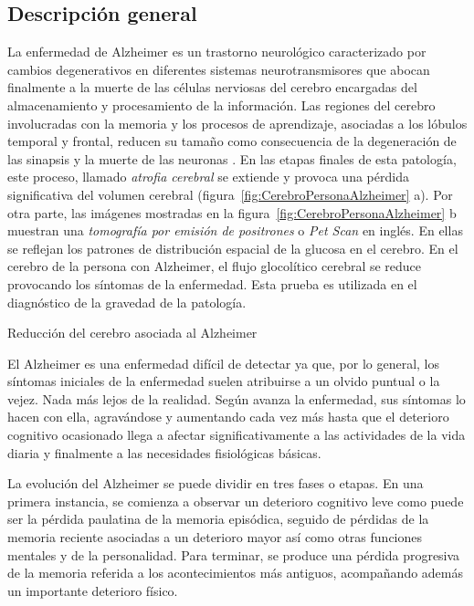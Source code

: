 \subsection{Descripción general}
La enfermedad de Alzheimer es un trastorno neurológico caracterizado por cambios degenerativos en diferentes sistemas neurotransmisores que abocan finalmente a la muerte de las células nerviosas del cerebro encargadas del almacenamiento y procesamiento de la información. Las regiones del cerebro involucradas con la memoria y los procesos de aprendizaje, asociadas a los lóbulos temporal y frontal, reducen su tamaño como consecuencia de la degeneración de las sinapsis y la muerte de las neuronas \citep{romano2007enfermedad,mattson2004pathways}. En las etapas finales de esta patología, este proceso, llamado \textit{atrofia cerebral} se extiende y provoca una pérdida significativa del volumen cerebral (figura~\ref{fig:CerebroPersonaAlzheimer} a).
Por otra parte, las imágenes mostradas en la figura~\ref{fig:CerebroPersonaAlzheimer} b muestran una \textit{tomografía por emisión de positrones} o \textit{Pet Scan} en inglés. En ellas se reflejan los patrones de distribución espacial de la glucosa en el cerebro. En el cerebro de la persona con Alzheimer, el flujo glocolítico cerebral se reduce provocando los síntomas de la enfermedad. Esta prueba es utilizada en el diagnóstico de la gravedad de la patología.

%
{Reducción del cerebro asociada al Alzheimer  \citep{mattson2004pathways}}

El Alzheimer es una enfermedad difícil de detectar ya que, por lo general, los síntomas iniciales de la enfermedad suelen atribuirse a un olvido puntual o la vejez. Nada más lejos de la realidad. Según avanza la enfermedad, sus síntomas lo hacen con ella, agravándose y aumentando cada vez más hasta que el deterioro cognitivo ocasionado llega a afectar significativamente a las actividades de la vida diaria y finalmente a las necesidades fisiológicas básicas.

La evolución del Alzheimer se puede dividir en tres fases o etapas. En una primera instancia, se comienza a observar un deterioro cognitivo leve como puede ser la pérdida paulatina de la memoria episódica, seguido de pérdidas de la memoria reciente asociadas a un deterioro mayor así como otras funciones mentales y de la personalidad. Para terminar, se produce una pérdida progresiva de la memoria referida a los acontecimientos más antiguos, acompañando además un importante deterioro físico.


